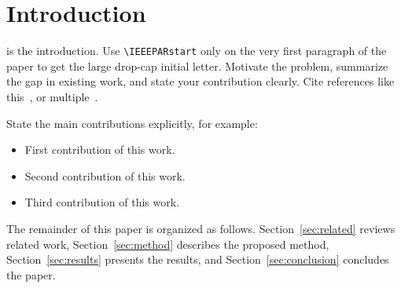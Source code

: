 \section{Introduction}
\label{sec:intro}

 is the introduction. Use \verb|\IEEEPARstart| only on
the very first paragraph of the paper to get the large drop-cap initial letter.
Motivate the problem, summarize the gap in existing work, and state your
contribution clearly. Cite references like this~\cite{ref1}, or
multiple~\cite{ref1,ref2}.

State the main contributions explicitly, for example:
\begin{itemize}
\item First contribution of this work.
\item Second contribution of this work.
\item Third contribution of this work.
\end{itemize}

The remainder of this paper is organized as follows.
Section~\ref{sec:related} reviews related work,
Section~\ref{sec:method} describes the proposed method,
Section~\ref{sec:results} presents the results, and
Section~\ref{sec:conclusion} concludes the paper.
